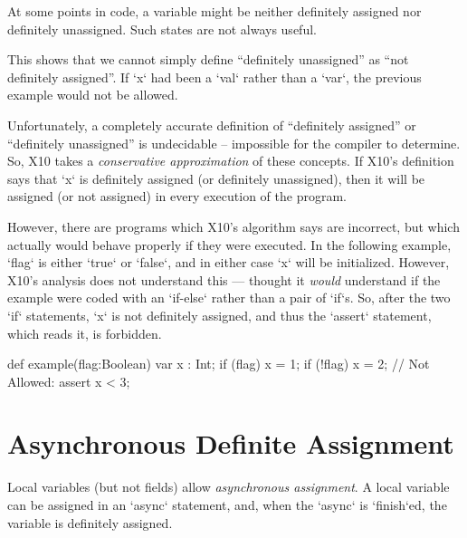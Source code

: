 At some points in code, a variable might be neither definitely assigned nor
definitely unassigned.    Such states are not always useful.  
% 
\begin{xten}
def example(flag : Boolean) {
  var x : Int;
  if (flag) x = 1;
  // x is neither def. assigned nor unassigned.
  x = 2; 
  // x is def. assigned.
\end{xten}
This shows that we cannot simply define ``definitely unassigned'' as ``not
definitely assigned''.   If \xcd`x` had been a \xcd`val` rather than a
\xcd`var`, the previous example would not be allowed.    

Unfortunately, a completely accurate definition of ``definitely assigned''
or ``definitely unassigned'' is undecidable -- impossible for the compiler to
determine.  So, X10 takes a {\em conservative approximation} of these
concepts.  If X10's definition says that \xcd`x` is definitely assigned (or
definitely unassigned), then it will be assigned (or not assigned) in every
execution of the program.  

However, there are programs which X10's algorithm says are incorrect, but
which actually would behave properly if they were executed.   In the following
example, \xcd`flag` is either \xcd`true` or \xcd`false`, and in either case
\xcd`x` will be initialized.  However, X10's analysis does not understand this
--- thought it {\em would} understand if the example were coded with an
\xcd`if-else` rather than a pair of \xcd`if`s.  So, after the two \xcd`if`
statements, \xcd`x` is not definitely assigned, and thus the \xcd`assert`
statement, which reads it, is forbidden.  
\begin{xten}
def example(flag:Boolean) {
  var x : Int;
  if (flag) x = 1;
  if (!flag) x = 2;
  // Not Allowed: assert x < 3;
}
\end{xten}

\section{Asynchronous Definite Assignment}


Local variables (but not fields) allow {\em asynchronous assignment}. A local
variable can be assigned in an \xcd`async` statement, and, when the
\xcd`async` is \xcd`finish`ed, the variable is definitely assigned.  

